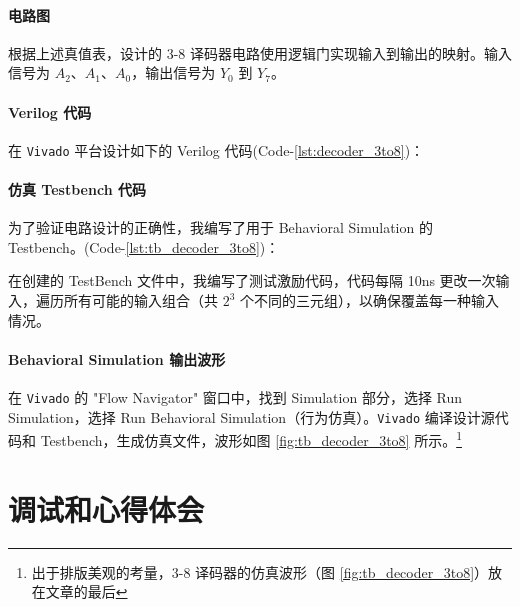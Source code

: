 \documentclass[10pt,a4paper,twoside]{rho-class/rho}
\begin{document}
        \paragraph{电路图}
        
            根据上述真值表，设计的 3-8 译码器电路使用逻辑门实现输入到输出的映射。输入信号为 $A_2$、$A_1$、$A_0$，输出信号为 $Y_0$ 到 $Y_7$。
        
        \paragraph{Verilog 代码}
        
        在 \verb|Vivado| 平台设计如下的 Verilog 代码(Code-\ref{lst:decoder_3to8})：
                

        
        \paragraph{仿真 Testbench 代码}
        
            为了验证电路设计的正确性，我编写了用于 Behavioral Simulation 的 Testbench。(Code-\ref{lst:tb_decoder_3to8})：
                

                
            在创建的 TestBench 文件中，我编写了测试激励代码，代码每隔 10ns 更改一次输入，遍历所有可能的输入组合（共 $2^3$ 个不同的三元组），以确保覆盖每一种输入情况。
        
        \paragraph{Behavioral Simulation 输出波形}
        
            在 \verb|Vivado| 的 "Flow Navigator" 窗口中，找到 Simulation 部分，选择 Run Simulation，选择 Run Behavioral Simulation（行为仿真）。\verb|Vivado| 编译设计源代码和 Testbench，生成仿真文件，波形如图 \ref{fig:tb_decoder_3to8} 所示。\footnote{出于排版美观的考量，3-8 译码器的仿真波形（图 \ref{fig:tb_decoder_3to8}）放在文章的最后}
            


\section{调试和心得体会}
\end{document}
